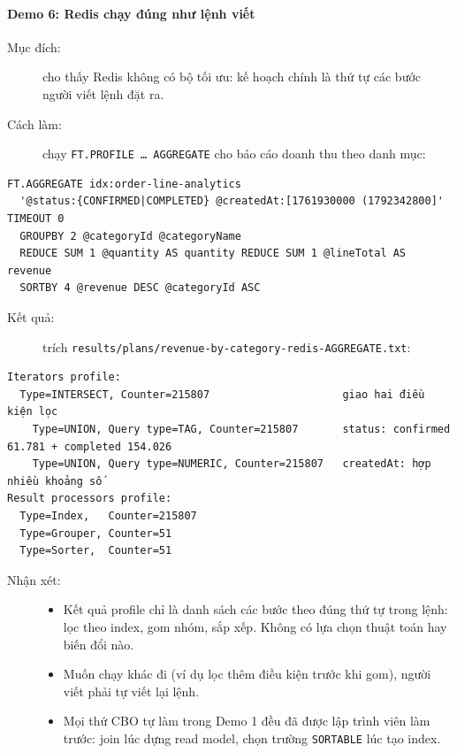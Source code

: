 \paragraph{Demo 6: Redis chạy đúng như lệnh viết}\label{sec:q-demo6}
\begin{description}
  \item[Mục đích:] cho thấy Redis không có bộ tối ưu: kế hoạch chính là thứ tự các bước người viết lệnh đặt ra.
  \item[Cách làm:] chạy \texttt{FT.PROFILE \ldots{} AGGREGATE} cho báo cáo doanh thu theo danh mục:
\end{description}
\begin{Verbatim}[fontsize=\scriptsize,frame=single]
FT.AGGREGATE idx:order-line-analytics
  '@status:{CONFIRMED|COMPLETED} @createdAt:[1761930000 (1792342800]' TIMEOUT 0
  GROUPBY 2 @categoryId @categoryName
  REDUCE SUM 1 @quantity AS quantity REDUCE SUM 1 @lineTotal AS revenue
  SORTBY 4 @revenue DESC @categoryId ASC
\end{Verbatim}
\begin{description}
  \item[Kết quả:] trích \texttt{results/plans/revenue-by-category-redis-AGGREGATE.txt}:
\end{description}
\begin{Verbatim}[fontsize=\scriptsize,frame=single]
Iterators profile:
  Type=INTERSECT, Counter=215807                     giao hai điều kiện lọc
    Type=UNION, Query type=TAG, Counter=215807       status: confirmed 61.781 + completed 154.026
    Type=UNION, Query type=NUMERIC, Counter=215807   createdAt: hợp nhiều khoảng số
Result processors profile:
  Type=Index,   Counter=215807
  Type=Grouper, Counter=51
  Type=Sorter,  Counter=51
\end{Verbatim}
\begin{description}
  \item[Nhận xét:]\leavevmode
  \begin{itemize}
    \item Kết quả profile chỉ là danh sách các bước theo đúng thứ tự trong lệnh: lọc theo index, gom nhóm, sắp xếp. Không có lựa chọn thuật toán hay biến đổi nào.
    \item Muốn chạy khác đi (ví dụ lọc thêm điều kiện trước khi gom), người viết phải tự viết lại lệnh.
    \item Mọi thứ CBO tự làm trong Demo 1 đều đã được lập trình viên làm trước: join lúc dựng read model, chọn trường \texttt{SORTABLE} lúc tạo index.
  \end{itemize}
\end{description}

